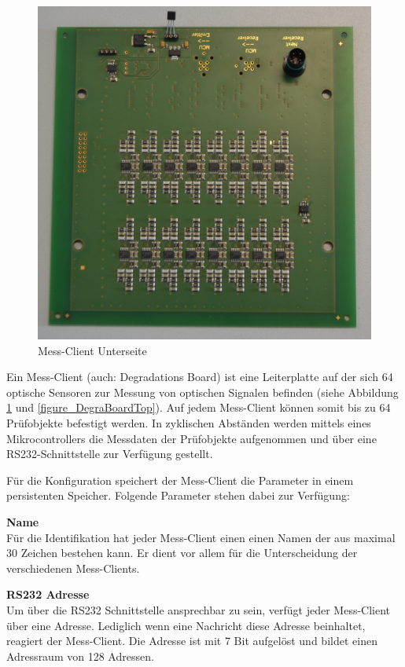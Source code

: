 \begin{figure}[H]
  \includegraphics[width=\linewidth]{img/general/DegraBoardBottom.jpg}
  \caption{Mess-Client Unterseite}\label{figure_DegraBoardBottom}
\endminipage
\end{figure}

Ein Mess-Client (auch: Degradations Board) ist eine Leiterplatte auf der sich 64 optische Sensoren zur Messung von optischen Signalen befinden (siehe Abbildung \ref{figure_DegraBoardBottom} und \ref{figure_DegraBoardTop}). Auf jedem Mess-Client können somit bis zu 64 Prüfobjekte befestigt werden. In zyklischen Abständen werden mittels eines Mikrocontrollers die Messdaten der Prüfobjekte aufgenommen und über eine RS232-Schnittstelle zur Verfügung gestellt.\ 

Für die Konfiguration speichert der Mess-Client die Parameter in einem persistenten Speicher. Folgende Parameter stehen dabei zur Verfügung:

\textbf{Name}\\
Für die Identifikation hat jeder Mess-Client einen einen Namen der aus maximal 30 Zeichen bestehen kann. Er dient vor allem für die Unterscheidung der verschiedenen Mess-Clients.\ 

\textbf{RS232 Adresse}\\
Um über die RS232 Schnittstelle ansprechbar zu sein, verfügt jeder Mess-Client über eine Adresse. Lediglich wenn eine Nachricht diese Adresse beinhaltet, reagiert der Mess-Client. Die Adresse ist mit 7 Bit aufgelöst und bildet einen Adressraum von 128 Adressen.\ 


